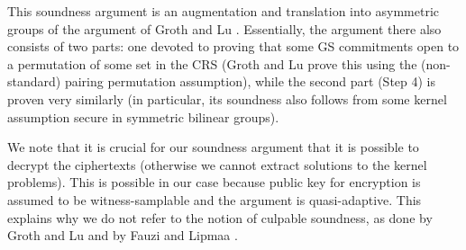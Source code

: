 This soundness argument is an augmentation and translation into asymmetric groups of the argument of Groth and Lu \cite{AC:GroLu07}. Essentially, the argument there also consists of two parts: one devoted to proving that some GS commitments open to a permutation of some set in the CRS (Groth and Lu prove this using the (non-standard) pairing permutation assumption), while the second part (Step 4) is proven very similarly (in particular, its soundness also follows from some kernel assumption secure in symmetric bilinear groups). 

We note that it is crucial for our soundness argument that it is possible to decrypt the ciphertexts (otherwise we cannot extract solutions to the kernel problems). This is possible in our case because public key for encryption is assumed to be witness-samplable and the argument is quasi-adaptive. This explains why we do not refer to the notion of culpable soundness, as done by Groth and Lu \cite{AC:GroLu07} and by Fauzi and Lipmaa \cite{EPRINT:FauLip15}.

